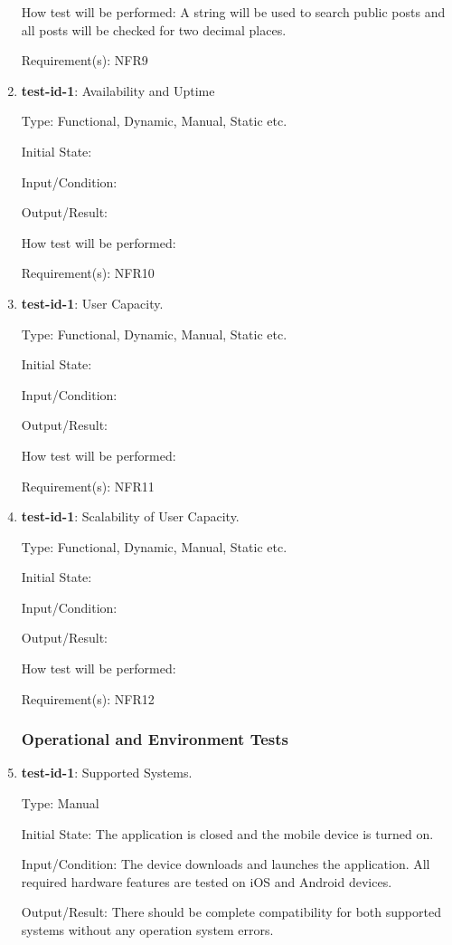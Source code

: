 \documentclass[12pt, titlepage]{article}
\begin{document}
\begin{enumerate}
		How test will be performed: A string will be used to search public posts and all posts will be checked for two decimal places.
		
		Requirement(s): NFR9
		
		\item{\textbf{test-id-1}}: Availability and Uptime
		
		Type: Functional, Dynamic, Manual, Static etc.
		
		Initial State: 
		
		Input/Condition: 
		
		Output/Result: 
		
		How test will be performed: 
		
		Requirement(s): NFR10
		
		\item{\textbf{test-id-1}}: User Capacity.
		
		Type: Functional, Dynamic, Manual, Static etc.
		
		Initial State: 
		
		Input/Condition: 
		
		Output/Result: 
		
		How test will be performed: 
		
		Requirement(s): NFR11
		
		\item{\textbf{test-id-1}}: Scalability of User Capacity.
		
		Type: Functional, Dynamic, Manual, Static etc.
		
		Initial State: 
		
		Input/Condition: 
		
		Output/Result: 
		
		How test will be performed: 
		
		Requirement(s): NFR12
	\subsubsection{Operational and Environment Tests}
		\item{\textbf{test-id-1}}: Supported Systems.
		
		Type: Manual
		
		Initial State: The application is closed and the mobile device is turned on.
		
		Input/Condition: The device downloads and launches the application. All required hardware features are tested on iOS and Android devices.
		
		Output/Result: There should be complete compatibility for both supported systems without any operation system errors. 
		

\end{enumerate}
\end{document}
